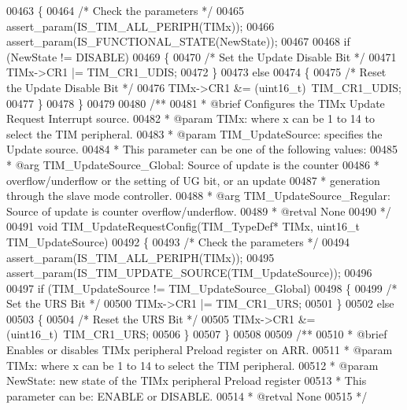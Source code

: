 \begin{DoxyCode}
00463 \{
00464   \textcolor{comment}{/* Check the parameters */}
00465   assert_param(IS\_TIM\_ALL\_PERIPH(TIMx));
00466   assert_param(IS\_FUNCTIONAL\_STATE(NewState));
00467 
00468   \textcolor{keywordflow}{if} (NewState != DISABLE)
00469   \{
00470     \textcolor{comment}{/* Set the Update Disable Bit */}
00471     TIMx->CR1 |= TIM_CR1_UDIS;
00472   \}
00473   \textcolor{keywordflow}{else}
00474   \{
00475     \textcolor{comment}{/* Reset the Update Disable Bit */}
00476     TIMx->CR1 &= (uint16\_t)~TIM_CR1_UDIS;
00477   \}
00478 \}
00479 
00480 \textcolor{comment}{/**}
00481 \textcolor{comment}{  * @brief  Configures the TIMx Update Request Interrupt source.}
00482 \textcolor{comment}{  * @param  TIMx: where x can be 1 to 14 to select the TIM peripheral.}
00483 \textcolor{comment}{  * @param  TIM\_UpdateSource: specifies the Update source.}
00484 \textcolor{comment}{  *          This parameter can be one of the following values:}
00485 \textcolor{comment}{  *            @arg TIM\_UpdateSource\_Global: Source of update is the counter}
00486 \textcolor{comment}{  *                 overflow/underflow or the setting of UG bit, or an update}
00487 \textcolor{comment}{  *                 generation through the slave mode controller.}
00488 \textcolor{comment}{  *            @arg TIM\_UpdateSource\_Regular: Source of update is counter overflow/underflow.}
00489 \textcolor{comment}{  * @retval None}
00490 \textcolor{comment}{  */}
00491 \textcolor{keywordtype}{void} TIM_UpdateRequestConfig(TIM\_TypeDef* TIMx, uint16\_t TIM\_UpdateSource)
00492 \{
00493   \textcolor{comment}{/* Check the parameters */}
00494   assert_param(IS\_TIM\_ALL\_PERIPH(TIMx));
00495   assert_param(IS\_TIM\_UPDATE\_SOURCE(TIM\_UpdateSource));
00496 
00497   \textcolor{keywordflow}{if} (TIM\_UpdateSource != TIM_UpdateSource_Global)
00498   \{
00499     \textcolor{comment}{/* Set the URS Bit */}
00500     TIMx->CR1 |= TIM_CR1_URS;
00501   \}
00502   \textcolor{keywordflow}{else}
00503   \{
00504     \textcolor{comment}{/* Reset the URS Bit */}
00505     TIMx->CR1 &= (uint16\_t)~TIM_CR1_URS;
00506   \}
00507 \}
00508 
00509 \textcolor{comment}{/**}
00510 \textcolor{comment}{  * @brief  Enables or disables TIMx peripheral Preload register on ARR.}
00511 \textcolor{comment}{  * @param  TIMx: where x can be 1 to 14 to select the TIM peripheral.}
00512 \textcolor{comment}{  * @param  NewState: new state of the TIMx peripheral Preload register}
00513 \textcolor{comment}{  *          This parameter can be: ENABLE or DISABLE.}
00514 \textcolor{comment}{  * @retval None}
00515 \textcolor{comment}{  */}

\end{DoxyCode}
